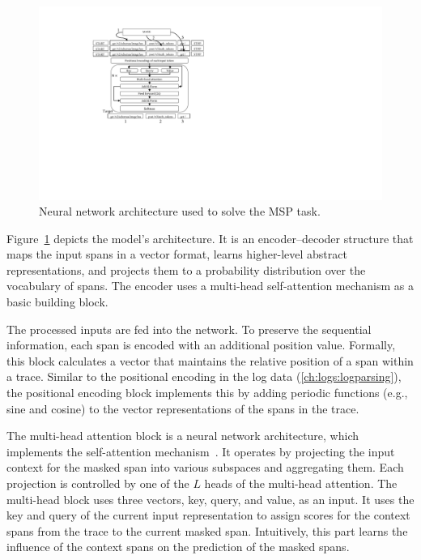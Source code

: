 \begin{figure}[!t]
\centerline{\includegraphics[width=1.0\textwidth]{gfx/chap6/tracymultihead.pdf}}
\caption{Neural network architecture used to solve the MSP task.}
\label{fig:msptracy}
\end{figure}

Figure~\ref{fig:msptracy} depicts the model's architecture. It is an encoder--decoder structure that maps the input spans in a vector format, learns higher-level abstract representations, and projects them to a probability distribution over the vocabulary of spans. The encoder uses a multi-head self-attention mechanism as a basic building block. 

The processed inputs are fed into the network. To preserve the sequential information, each span is encoded with an additional position value. Formally, this block calculates a vector that maintains the relative position of a span within a trace. Similar to the positional encoding in the log data (\autoref{ch:logs:logparsing}), the positional encoding block implements this by adding periodic functions (e.g., sine and cosine) to the vector representations of the spans in the trace.

The multi-head attention block is a neural network architecture, which implements the self-attention mechanism~\cite{vaswani2017attention}. It operates by projecting the input context for the masked span into various subspaces and aggregating them. Each projection is controlled by one of the $L$ heads of the multi-head attention. The multi-head block uses three vectors, key, query, and value, as an input. It uses the key and query of the current input representation to assign scores for the context spans from the trace to the current masked span. Intuitively, this part learns the influence of the context spans on the prediction of the masked spans. 

